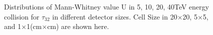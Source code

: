 \documentclass[final,1p,11pt]{elsarticle}
\begin{document}
\begin{figure}
\begin{center}
{   }
   \end{center}
\caption{Distributions of Mann-Whitney value U in 5, 10, 20, 40TeV energy collision for $\tau_{32}$  in different detector sizes. Cell Size in 20$\times$20, 5$\times$5, and 1$\times$1(cm$\times$cm) are shown here.}
\label{fig:cluster_tau32_tau32}
\end{figure}
\end{document}

